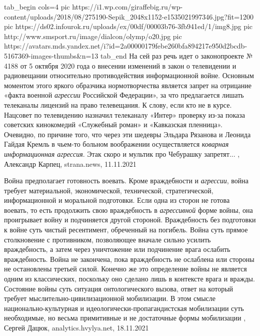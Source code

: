 \ifcmt
  tab_begin cols=4
		 pic https://i1.wp.com/giraffebig.ru/wp-content/uploads/2018/08/275190-Sepik_2048x1152-e1535021997346.jpg?fit=1200%
		 pic https://ds02.infourok.ru/uploads/ex/00df/00003b76-3fb941ed/1/img8.jpg
     pic http://www.smsport.ru/image/dialcon/olymp/o20.jpg
     pic https://avatars.mds.yandex.net/i?id=2a00000179febe260bfa894217e950d2bcdb-5167369-images-thumbs&n=13
  tab_end
\fi
На сей раз речь идет о законопроекте № 4188 от 5 октября 2020 года о внесении
изменений в закон о телевидении и радиовещании относительно противодействия
информационной войне. Основным моментом этого яркого образчика нормотворчества
является запрет на отрицание «факта военной \emph{агрессии} Российской
Федерации», за что предлагается лишать телеканалы лицензий на право
телевещания.  К слову, если кто не в курсе. Нацсовет по телевидению назначил
телеканалу «Интер» проверку из-за показа советских кинокомедий «Служебный
роман» и «Кавказская пленница». Очевидно, по причине того, что через эти
шедевры Эльдара Рязанова и Леонида Гайдая Кремль в чьем-то больном воображении
осуществляется \emph{коварная информационная агрессия}. Этак скоро и мультик
про Чебурашку запретят...
, 
Александр Карпец, strana.news, 11.11.2021

Война предполагает готовность воевать. Кроме враждебности и \emph{агрессии},
война требует материальной, экономической, технической, стратегической,
информационной и моральной подготовки. Если одна из сторон не готова воевать,
то есть продолжить свою враждебность в \emph{агрессивной} форме войны, она проигрывает
войну и подчиняется другой стороной.  Враждебность без подготовки к войне суть
чистый ресентимент, обреченный на погибель.  Война суть прямое столкновение с
противником, позволяющее вначале сильно усилить враждебность, а затем через
уничтожение или подчинение врага ослабить враждебность.  Война не закончена,
пока враждебность не ослаблена или стороны не остановлены третьей силой.
Конечно же это определение войны не является одним из классических, поскольку
оно сделано лишь в контексте врага и вражды.  Состояние войны суть ситуация
онтологического вызова, ответ на который требует мыслительно-цивилизационной
мобилизации. В этом смысле национально-культурная и
идеологически-пропагандистская мобилизации суть необходимые, но весьма
примитивные и не достаточные формы мобилизации
, Сергей Дацюк, analytics.hvylya.net, 18.11.2021

